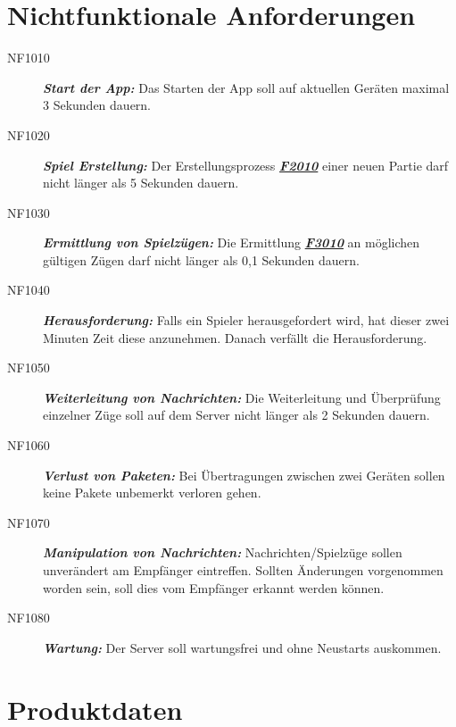 \documentclass[parskip=full]{scrartcl}
\begin{document}
\section{Nichtfunktionale Anforderungen}
\begin{description}
	
	\item[NF1010] \textbf{\textit{Start der App: }} Das Starten der App soll auf aktuellen Geräten maximal 3 Sekunden dauern. 
	\item[NF1020] \textbf{\textit{Spiel Erstellung: }} Der Erstellungsprozess \hyperlink{F2010}{\textbf{\textit{F2010}}} einer neuen Partie darf nicht länger als 5 Sekunden dauern.
	\item[NF1030] \textbf{\textit{Ermittlung von Spielzügen: }} Die Ermittlung \hyperlink{F3010}{\textbf{\textit{F3010}}} an möglichen gültigen Zügen darf nicht länger als 0,1 Sekunden dauern.
	\item[NF1040] \textbf{\textit{Herausforderung: }} Falls ein Spieler herausgefordert wird, hat dieser zwei Minuten Zeit diese anzunehmen. Danach verfällt die Herausforderung. 
	\item[NF1050] \textbf{\textit{Weiterleitung von Nachrichten: }} Die Weiterleitung und Überprüfung einzelner Züge soll auf dem Server nicht länger als 2 Sekunden dauern.
	\item[NF1060] \textbf{\textit{Verlust von Paketen: }} Bei Übertragungen zwischen zwei Geräten sollen keine Pakete unbemerkt verloren gehen.
	\item[NF1070] \textbf{\textit{Manipulation von Nachrichten: }} Nachrichten/Spielzüge sollen unverändert am Empfänger eintreffen. Sollten Änderungen vorgenommen worden sein, soll dies vom Empfänger erkannt werden können.
	\item[NF1080] \textbf{\textit{Wartung: }} Der Server soll wartungsfrei und ohne Neustarts auskommen.

	
\end{description}

\newpage
\section{Produktdaten}
\end{document}
